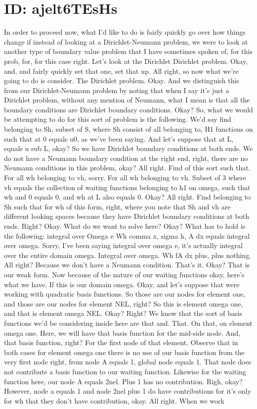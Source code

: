 \documentclass[10pt]{article}
\begin{document}
{\section*{ID: ajelt6TEsHs}
In order to proceed now, what I'd like to do is fairly quickly go over how things change if instead of looking at a Dirichlet-Neumann problem, we were to look at another type of boundary value problem that I have sometimes spoken of, for this prob, for, for this case right. Let's look at the Dirichlet Dirichlet problem. Okay, and, and fairly quickly set that one, set that up. All right, so now what we're going to do is consider. The Dirichlet problem. Okay. And we distinguish this from our Dirichlet-Neumann problem by noting that when I say it's just a Dirichlet problem, without any mention of Neumann, what I mean is that all the boundary conditions are Dirichlet boundary conditions. Okay? So, what we would be attempting to do for this sort of problem is the following. We'd say find belonging to Sh, subset of S, where Sh consist of all belonging to, H1 functions on such that at 0 equals u0, as we've been saying. And let's suppose that at L, equals u sub L, okay? So we have Dirichlet boundary conditions at both ends. We do not have a Neumann boundary condition at the right end, right, there are no Neumann conditions in this problem, okay? All right. Find of this sort such that. For all wh belonging to vh, sorry. For all wh belonging to vh. Subset of 3 where vh equals the collection of waiting functions belonging to h1 on omega, such that wh and 0 equals 0, and wh at L also equals 0. Okay? All right. Find belonging to Sh such that for wh of this form, right, where you note that Sh and vh are different looking spaces because they have Dirichlet boundary conditions at both ends. Right? Okay. What do we want to solve here? Okay? What has to hold is the following: integral over Omega e Wh comma x, sigma h, A dx equals integral over omega. Sorry, I've been saying integral over omega e, it's actually integral over the entire domain omega. Integral over omega. Wh fA dx plus, plus nothing. All right? Because we don't have a Neumann condition. That's it. Okay? That is our weak form. Now because of the nature of our waiting functions okay, here's what we have. If this is our domain omega. Okay, and let's suppose that were working with quadratic basis functions. So those are our nodes for element one, and those are our nodes for element NEL, right? So this is element omega one, and that is element omega NEL. Okay? Right? We know that the sort of basis functions we'd be considering inside here are that and. That. On that, on element omega one. Here, we will have that basis function for the mid-side node. And, that basis function, right? For the first node of that element. Observe that in both cases for element omega one there is no use of our basis function from the very first node right, from node A equals 1, global node equals 1. That node does not contribute a basis function to our waiting function. Likewise for the waiting function here, our node A equals 2nel. Plus 1 has no contribution. Righ, okay? However, node a equals 1 and node 2nel plus 1 do have contributions for it's only for wh that they don't have contribution, okay. All right. When we work }
\end{document}
